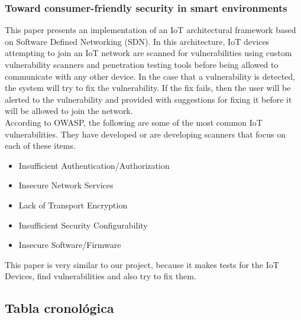 \subsubsection{Toward consumer-friendly security in smart environments}\cite{Paper7}
This paper presents an implementation of an IoT architectural framework based on Software Defined Networking (SDN). In this architecture, IoT devices attempting to join an IoT network are scanned for vulnerabilities using custom vulnerability scanners and penetration testing tools before being allowed to communicate with any other device. In the case that a vulnerability is detected, the system will try to fix the vulnerability. If the fix fails, then the user will be alerted to the vulnerability and provided with suggestions for fixing it before it will be allowed to join the network.\\
According to OWASP, the following are some of the most common IoT vulnerabilities. They have developed or are developing scanners that focus on each of these items.
\begin{itemize}
	\item Insufficient Authentication/Authorization
	\item Insecure Network Services
	\item Lack of Transport Encryption
	\item Insufficient  Security  Configurability
	\item Insecure Software/Firmware
\end{itemize}
This paper is very similar to our project, because it makes tests for the IoT Devices, find vulnerabilities and also try to fix them.

\subsection{Tabla cronológica}

